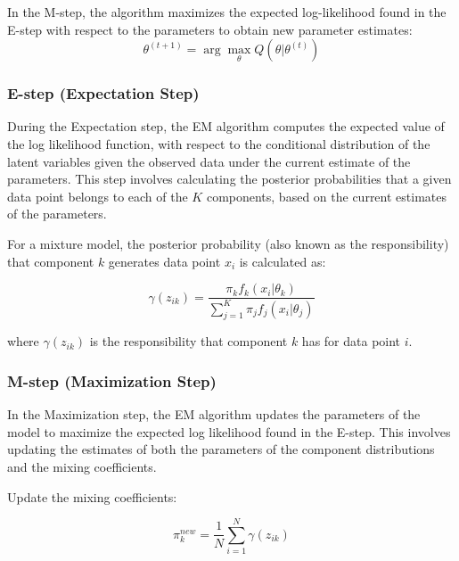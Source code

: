 \documentclass{article}
\begin{document}
In the M-step, the algorithm maximizes the expected log-likelihood found in the E-step with respect to the parameters to obtain new parameter estimates:
\begin{equation}
\theta^{(t+1)} = \arg \max_{\theta} Q(\theta | \theta^{(t)})
\end{equation}

\subsubsection*{E-step (Expectation Step)}

During the Expectation step, the EM algorithm computes the expected value of the log likelihood function, with respect to the conditional distribution of the latent variables given the observed data under the current estimate of the parameters. This step involves calculating the posterior probabilities that a given data point belongs to each of the $K$ components, based on the current estimates of the parameters.

For a mixture model, the posterior probability (also known as the responsibility) that component $k$ generates data point $x_i$ is calculated as:

\begin{equation}
\gamma(z_{ik}) = \frac{\pi_k f_k(x_i|\theta_k)}{\sum_{j=1}^{K} \pi_j f_j(x_i|\theta_j)}
\end{equation}

where $\gamma(z_{ik})$ is the responsibility that component $k$ has for data point $i$.

\subsubsection*{M-step (Maximization Step)}

In the Maximization step, the EM algorithm updates the parameters of the model to maximize the expected log likelihood found in the E-step. 
This involves updating the estimates of both the parameters of the component distributions and the mixing coefficients.

Update the mixing coefficients:

\begin{equation}
\pi_k^{new} = \frac{1}{N} \sum_{i=1}^{N} \gamma(z_{ik})
\end{equation}

\end{document}
